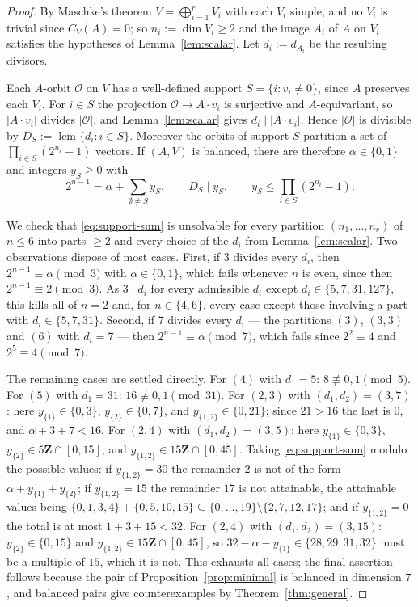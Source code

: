 \documentclass[11pt,a4paper,reqno]{amsart}
\theoremstyle{definition}
\theoremstyle{remark}
\begin{document}
\begin{proof}
By Maschke's theorem $V=\bigoplus_{i=1}^rV_i$ with each $V_i$ simple,
and no $V_i$ is trivial since $C_V(A)=0$; so $n_i:=\dim V_i\ge2$ and
the image $A_i$ of $A$ on $V_i$ satisfies the hypotheses of
Lemma~\ref{lem:scalar}.  Let $d_i:=d_{A_i}$ be the resulting divisors.

Each $A$-orbit $\mathcal O$ on $V$ has a well-defined support
$S=\{i:v_i\neq0\}$, since $A$ preserves each $V_i$.  For
$i\in S$ the projection $\mathcal O\to A\cdot v_i$ is surjective and
$A$-equivariant, so $|A\cdot v_i|$ divides $|\mathcal O|$, and
Lemma~\ref{lem:scalar} gives $d_i\mid|A\cdot v_i|$.  Hence
$|\mathcal O|$ is divisible by $D_S:=\operatorname{lcm}\{d_i:i\in S\}$.
Moreover the orbits of support $S$ partition a set of
$\prod_{i\in S}(2^{n_i}-1)$ vectors.  If $(A,V)$ is balanced, there are
therefore $\alpha\in\{0,1\}$ and integers $y_S\ge0$ with
\begin{equation}\label{eq:support-sum}
 2^{n-1}=\alpha+\sum_{\emptyset\neq S}y_S,
 \qquad D_S\mid y_S,
 \qquad y_S\le\prod_{i\in S}(2^{n_i}-1) .
\end{equation}

We check that \eqref{eq:support-sum} is unsolvable for every partition
$(n_1,\dots,n_r)$ of $n\le6$ into parts $\ge2$ and every choice of the
$d_i$ from Lemma~\ref{lem:scalar}.  Two observations dispose of most
cases.  First, if $3$ divides every $d_i$, then
$2^{n-1}\equiv\alpha\pmod3$ with $\alpha\in\{0,1\}$, which fails
whenever $n$ is even, since then $2^{n-1}\equiv2\pmod3$.  As
$3\mid d_i$ for every admissible $d_i$ except $d_i\in\{5,7,31,127\}$,
this kills all of $n=2$ and, for $n\in\{4,6\}$, every case except those
involving a part with $d_i\in\{5,7,31\}$.  Second, if $7$ divides every
$d_i$ --- the partitions $(3)$, $(3,3)$ and $(6)$ with
$d_i=7$ --- then $2^{n-1}\equiv\alpha\pmod7$, which fails since
$2^2\equiv4$ and $2^5\equiv4\pmod7$.

The remaining cases are settled directly.  For $(4)$ with $d_1=5$:
$8\not\equiv0,1\pmod5$.  For $(5)$ with $d_1=31$: $16\not\equiv0,1
\pmod{31}$.  For $(2,3)$ with $(d_1,d_2)=(3,7)$: here
$y_{\{1\}}\in\{0,3\}$, $y_{\{2\}}\in\{0,7\}$, and
$y_{\{1,2\}}\in\{0,21\}$; since $21>16$ the last is $0$, and
$\alpha+3+7<16$.  For $(2,4)$ with $(d_1,d_2)=(3,5)$: here
$y_{\{1\}}\in\{0,3\}$, $y_{\{2\}}\in5\mathbf Z\cap[0,15]$, and
$y_{\{1,2\}}\in15\mathbf Z\cap[0,45]$.  Taking
\eqref{eq:support-sum} modulo the possible values: if
$y_{\{1,2\}}=30$ the remainder $2$ is not of the form $\alpha+y_{\{1\}}
+y_{\{2\}}$; if $y_{\{1,2\}}=15$ the remainder $17$ is not attainable,
the attainable values being
$\{0,1,3,4\}+\{0,5,10,15\}\subseteq\{0,\dots,19\}\setminus\{2,7,12,17\}$;
and if $y_{\{1,2\}}=0$ the total is at most $1+3+15<32$.  For
$(2,4)$ with $(d_1,d_2)=(3,15)$: $y_{\{2\}}\in\{0,15\}$ and
$y_{\{1,2\}}\in15\mathbf Z\cap[0,45]$, so
$32-\alpha-y_{\{1\}}\in\{28,29,31,32\}$ must be a multiple of $15$,
which it is not.  This exhausts all cases; the final assertion follows
because the pair of Proposition~\ref{prop:minimal} is balanced in
dimension $7$, and balanced pairs give counterexamples by
Theorem~\ref{thm:general}.
\end{proof}
\end{document}
